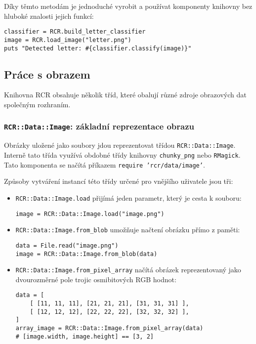 \documentclass[a4paper]{article}
\begin{document}
Díky těmto metodám je jednoduché vyrobit a používat komponenty knihovny
bez hluboké znalosti jejich funkcí:
\begin{lstlisting}
classifier = RCR.build_letter_classifier
image = RCR.load_image("letter.png")
puts "Detected letter: #{classifier.classify(image)}"
\end{lstlisting}

\subsection{Práce s obrazem}
Knihovna RCR obsahuje několik tříd, které obalují různé zdroje obrazových dat
společným rozhraním.

\subsubsection{\texttt{RCR::Data::Image}: základní reprezentace obrazu}
Obrázky uložené jako soubory jdou reprezentovat třídou
\texttt{RCR::Data::Image}. Interně tato třída využívá obdobné třídy knihovny
\texttt{chunky\_png} nebo \texttt{RMagick}.
Tato komponenta se načítá příkazem \texttt{require 'rcr/data/image'}.

Způsoby vytváření instancí této třídy určené pro vnějšího uživatele jsou tři:
\begin{itemize}
\item \texttt{RCR::Data::Image.load} přijímá jeden parametr, který je cesta k
souboru:
\begin{lstlisting}
image = RCR::Data::Image.load("image.png")
\end{lstlisting}
\item \texttt{RCR::Data::Image.from\_blob} umožňuje načtení obrázku přímo z
paměti:
\begin{lstlisting}
data = File.read("image.png")
image = RCR::Data::Image.from_blob(data)
\end{lstlisting}
\item \texttt{RCR::Data::Image.from\_pixel\_array} načítá obrázek reprezentovaný
jako dvourozměrné pole trojic osmibitových RGB hodnot:
\begin{lstlisting}
data = [
	[ [11, 11, 11], [21, 21, 21], [31, 31, 31] ],
	[ [12, 12, 12], [22, 22, 22], [32, 32, 32] ],
]
array_image = RCR::Data::Image.from_pixel_array(data)
# [image.width, image.height] == [3, 2]
\end{lstlisting}
\end{itemize}
\end{document}
